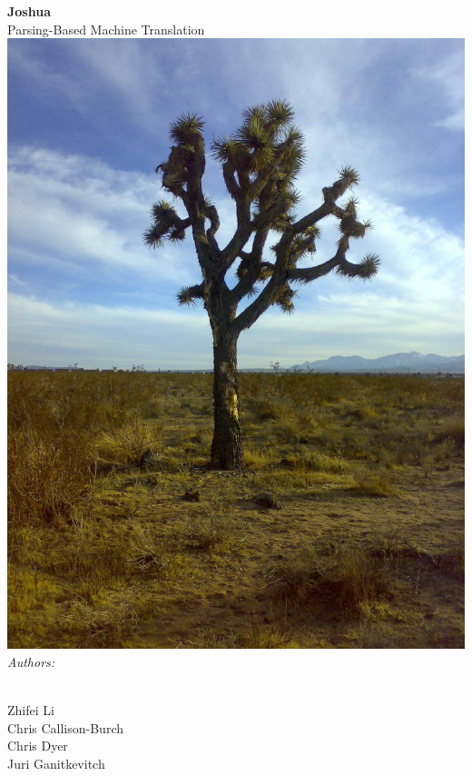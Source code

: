 \begin{titlepage}
\begin{center}
%
%
{\huge \bfseries
Joshua\\}
{ \Large
Parsing-Based Machine Translation\\} 
%
\includegraphics[width=.9\linewidth]{images/joshua-tree}
\emph{Authors:}\\
\ \\
\begin{minipage}{0.4\textwidth}
%
\begin{flushleft} \large
Zhifei Li\\
Chris Callison-Burch\\
Chris Dyer\\
Juri Ganitkevitch\\
\end{flushleft}
\end{minipage}
%
\begin{minipage}{0.4\textwidth}
\begin{flushright} \large

\end{flushright}
\end{minipage}
\end{center}
\end{titlepage}
